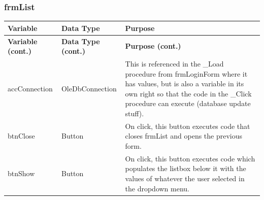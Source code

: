 	\subsubsection{frmList}
	\begin{longtable}{| p{4cm} | p{3cm} | p{10cm} |}
		\hline
		\textbf{Variable} & \textbf{Data Type} & \textbf{Purpose}\\
		\endfirsthead
		\hline
		\textbf{Variable (cont.)} & \textbf{Data Type (cont.)} & \textbf{Purpose (cont.)}\\
		\endhead
		\hline
		accConnection & OleDbConnection & This is referenced in the \_Load procedure from frmLoginForm where it has values, but is also a variable in its own right so that the code in the \_Click procedure can execute (database update stuff).\\
		\hline
		btnClose & Button & On click, this button executes code that closes frmList and opens the previous form.\\
		\hline
		btnShow & Button & On click, this button executes code which populates the listbox below it with the values of whatever the user selected in the dropdown menu.\\
		\hline
		

\end{longtable}
